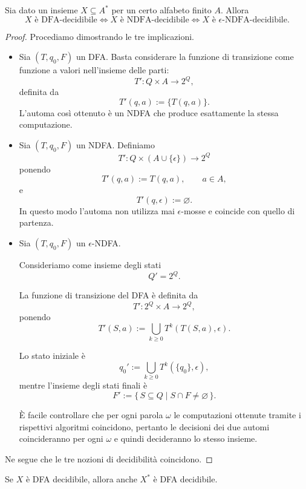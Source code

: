 \begin{prop}
\label{prop:19}
Sia dato un insieme $X \subseteq A^*$ per un certo alfabeto finito $A$.
Allora
\[
X \text{ è DFA-decidibile}
\iff
X \text{ è NDFA-decidibile}
\iff
X \text{ è }\epsilon\text{-NDFA-decidibile}.
\]

\begin{proof}
Procediamo dimostrando le tre implicazioni.

\begin{itemize}

\item[$(\mathrm{DFA}\Rightarrow\mathrm{NDFA})$]
Sia $(T,q_0,F)$ un DFA. Basta considerare la funzione di transizione come funzione a valori nell'insieme delle parti:
\[
T' : Q\times A\longrightarrow 2^Q,
\]
definita da
\[
T'(q,a):=\{T(q,a)\}.
\]
L'automa così ottenuto è un NDFA che produce esattamente la stessa computazione.

\item[$(\mathrm{NDFA}\Rightarrow\epsilon\text{-}\mathrm{NDFA})$]
Sia $(T,q_0,F)$ un NDFA. Definiamo
\[
T':Q\times(A\cup\{\epsilon\})\longrightarrow 2^Q
\]
ponendo
\[
T'(q,a):=T(q,a),
\qquad
a\in A,
\]
e
\[
T'(q,\epsilon):=\varnothing.
\]
In questo modo l'automa non utilizza mai $\epsilon$-mosse e coincide con quello di partenza.

\item[$(\epsilon\text{-}\mathrm{NDFA}\Rightarrow\mathrm{DFA})$]
Sia $(T,q_0,F)$ un $\epsilon$-NDFA.

Consideriamo come insieme degli stati
\[
Q'=2^Q.
\]

La funzione di transizione del DFA è definita da
\[
T':2^Q\times A\longrightarrow 2^Q,
\]
ponendo
\[
T'(S,a):=
\bigcup_{k\ge0}
T^k(T(S,a),\epsilon).
\]

Lo stato iniziale è
\[
q_0':=
\bigcup_{k\ge0}
T^k(\{q_0\},\epsilon),
\]
mentre l'insieme degli stati finali è
\[
F':=
\{\,S\subseteq Q\mid S\cap F\neq\varnothing\,\}.
\]

È facile controllare che per ogni parola $\omega$ le computazioni ottenute tramite i rispettivi algoritmi coincidono, pertanto le decisioni dei due automi coincideranno per ogni $\omega$ e quindi decideranno lo stesso
insieme.

\end{itemize}

Ne segue che le tre nozioni di decidibilità coincidono.
\end{proof}
\end{prop}
\begin{coro}
Se $X$ è DFA decidibile,
allora anche $X^*$ è DFA decidibile.    
\end{coro}
